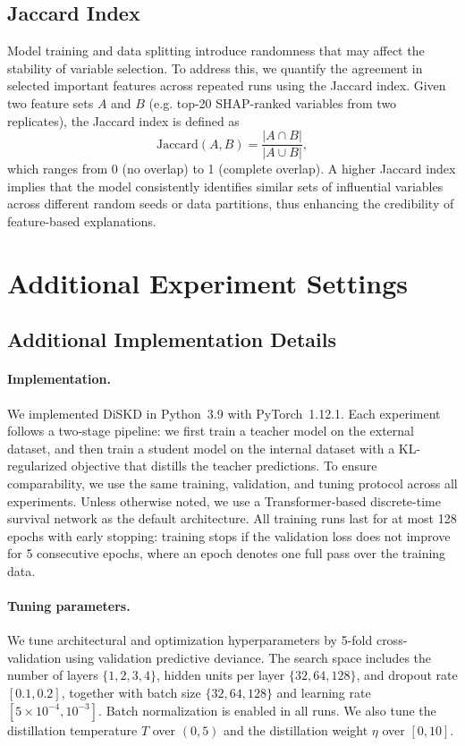 \documentclass{article}
\theoremstyle{plain}
\theoremstyle{definition}
\theoremstyle{remark}
\begin{document}
\subsection{Jaccard Index}
Model training and data splitting introduce randomness that may affect the stability of variable selection. To address this, we quantify the agreement in selected important features across repeated runs using the Jaccard index. Given two feature sets $A$ and $B$ (e.g. top-20 SHAP-ranked variables from two replicates), the Jaccard index is defined as
\begin{equation}
    \text{Jaccard}(A, B) = \frac{|A \cap B|}{|A \cup B|},
\end{equation}
which ranges from 0 (no overlap) to 1 (complete overlap). A higher Jaccard index implies that the model consistently identifies similar sets of influential variables across different random seeds or data partitions, thus enhancing the credibility of feature-based explanations.




\section{Additional Experiment Settings}
\subsection{Additional Implementation Details}
\label{A.ImpleDetails}
\paragraph{Implementation.}
We implemented DiSKD in Python~3.9 with PyTorch~1.12.1.
Each experiment follows a two-stage pipeline: we first train a teacher model on the external dataset, and then train a student model on the internal dataset with a KL-regularized objective that distills the teacher predictions.
To ensure comparability, we use the same training, validation, and tuning protocol across all experiments.
Unless otherwise noted, we use a Transformer-based discrete-time survival network as the default architecture.
All training runs last for at most 128 epochs with early stopping: training stops if the validation loss does not improve for 5 consecutive epochs, where an epoch denotes one full pass over the training data.

\paragraph{Tuning parameters.} We tune architectural and optimization hyperparameters by 5-fold cross-validation using validation predictive deviance.
The search space includes the number of layers $\{1,2,3,4\}$, hidden units per layer $\{32,64,128\}$, and dropout rate $\left[0.1,0.2\right]$, together with batch size $\{32,64,128\}$ and learning rate $\left[5\times10^{-4},10^{-3}\right]$.
Batch normalization is enabled in all runs.
We also tune the distillation temperature $T$ over $(0,5)$ and the distillation weight $\eta$ over $\left[0,10\right]$.
\end{document}
